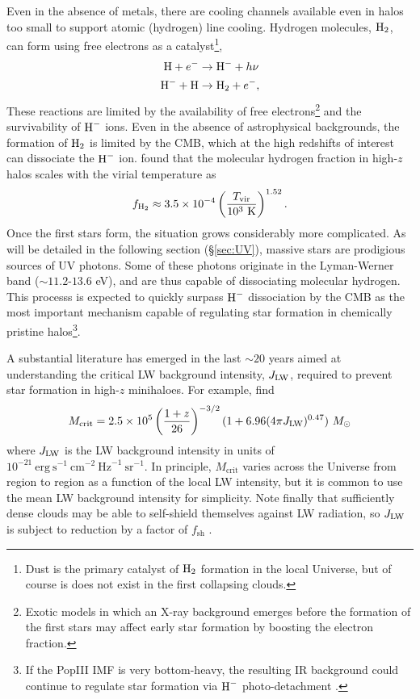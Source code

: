 Even in the absence of metals, there are cooling channels available even in halos too small to support atomic (hydrogen) line cooling. Hydrogen molecules, $\text{H}_2$, can form using free electrons as a catalyst\footnote{Dust is the primary catalyst of $\text{H}_2$ formation in the local Universe, but of course is does not exist in the first collapsing clouds.}, 
\begin{align}
	\text{H} + e^- & \rightarrow \text{H}^- + h\nu \\
	\text{H}^- + \text{H} & \rightarrow \text{H}_2 + e^- ,
\end{align}
These reactions are limited by the availability of free electrons\footnote{
Exotic models in which an X-ray background emerges before the formation of the first stars may affect early star formation by boosting the electron fraction.} and the survivability of $\text{H}^{-}$ ions. Even in the absence of astrophysical backgrounds, the formation of $\text{H}_2$ is limited by the CMB, which at the high redshifts of interest can dissociate the $\text{H}^{-}$ ion. \cite{Tegmark1997} found that the molecular hydrogen fraction in high-$z$ halos scales with the virial temperature as
\begin{equation}
	f_{\text{H}_2} \approx 3.5 \times 10^{-4} \left(\frac{T_{\text{vir}}}{10^3 \ \mathrm{K}} \right)^{1.52} .
\end{equation}
Once the first stars form, the situation grows considerably more complicated. As will be detailed in the following section (\S\ref{sec:UV}), massive stars are prodigious sources of UV photons. Some of these photons originate in the Lyman-Werner band ($\sim 11.2$-$13.6$ eV), and are thus capable of dissociating molecular hydrogen. This processs is expected to quickly surpass $\text{H}^{-}$ dissociation by the CMB as the most important mechanism capable of regulating star formation in chemically pristine halos\footnote{If the PopIII IMF is very bottom-heavy, the resulting IR background  could continue to regulate star formation via $\text{H}^{-}$ photo-detachment \cite{WolcottGreen2012}.}. 

A substantial literature has emerged in the last $\sim 20$ years aimed at understanding the critical LW background intensity, $J_{\text{LW}}$, required to prevent star formation in high-$z$ minihaloes. For example, \cite{Visbal2014} find
\begin{equation}
	M_{\mathrm{crit}} = 2.5 \times 10^5 \left(\frac{1+z}{26} \right)^{-3/2} (1 + 6.96(4\pi \JLW)^{0.47})  \ \Msun
\end{equation}
where $J_{\text{LW}}$ is the LW background intensity in units of $10^{-21} \ \mathrm{erg} \ \mathrm{s}^{-1} \ \mathrm{cm}^{-2} \ \mathrm{Hz}^{-1} \ \mathrm{sr}^{-1}$. In principle, $M_{\mathrm{crit}}$ varies across the Universe from region to region as a function of the local LW intensity, but it is common to use the mean LW background intensity for simplicity. Note finally that sufficiently dense clouds may be able to self-shield themselves against LW radiation, so $J_{\text{LW}}$ is subject to reduction by a factor of $f_{\mathrm{sh}}$ \cite{WolcottGreen2011}.


